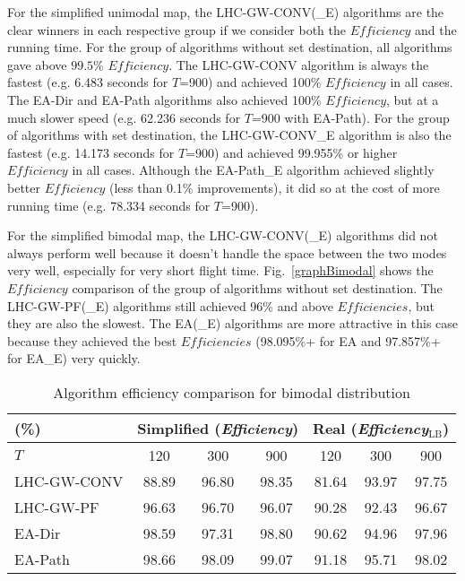 For the simplified unimodal map, the LHC-GW-CONV(\_E) algorithms are the clear winners in each respective group if we consider both the $\mathit{Efficiency}$ and the running time. For the group of algorithms without set destination, all algorithms gave above $99.5\%$ $\mathit{Efficiency}$. The LHC-GW-CONV algorithm is always the fastest  (e.g. 6.483 seconds for $T$=900) and achieved 100\% $\mathit{Efficiency}$ in all cases. The EA-Dir and EA-Path algorithms also achieved 100\% $\mathit{Efficiency}$, but at a much slower speed (e.g. 62.236 seconds for $T$=900 with EA-Path). For the group of algorithms with set destination, the LHC-GW-CONV\_E algorithm is also the fastest  (e.g. 14.173 seconds for $T$=900) and achieved 99.955\% or higher $\mathit{Efficiency}$ in all cases. Although the EA-Path\_E algorithm achieved slightly better $\mathit{Efficiency}$ (less than 0.1\% improvements), it did so at the cost of more running time (e.g. 78.334 seconds for $T$=900).

For the simplified bimodal map, the LHC-GW-CONV(\_E) algorithms did not always perform well because it doesn't handle the space between the two modes very well, especially for very short flight time. Fig.~\ref{graphBimodal} shows the $\mathit{Efficiency}$ comparison of the group of algorithms without set destination. The LHC-GW-PF(\_E) algorithms still achieved 96\% and above $\mathit{Efficiencies}$, but they are also the slowest. The EA(\_E) algorithms are more attractive in this case because they achieved the best $\mathit{Efficiencies}$ (98.095\%+ for EA and 97.857\%+ for EA\_E) very quickly.

\begin{table}
	\centering
		\begin{tabular}
			{|l|c|c|c|c|c|c|}
			\hline
			(\%) & \multicolumn{3}{|c|}{Simplified ({\it{Efficiency}})} & \multicolumn{3}{|c|}{Real ({\it{Efficiency$_\textrm{LB}$}})} \\
			\hline
			$T$ & 120 & 300 & 900	& 120 & 300 & 900 \\
			\hline
			LHC-GW-CONV & 88.89 & 96.80 & 98.35 & 81.64 & 93.97 & 97.75 \\
			\hline			
			LHC-GW-PF	& 96.63 & 96.70 & 96.07 & 90.28 & 92.43 & 96.67 \\ 
			\hline
			EA-Dir & 98.59 & 97.31 & 98.80 & 90.62 & 94.96 & 97.96 \\
			\hline
			EA-Path & 98.66 & 98.09 & 99.07 & 91.18 & 95.71 & 98.02 \\
			\hline
		\end{tabular}
\caption{Algorithm efficiency comparison for bimodal distribution}
\label{EBimodalSimplified}
\vspace*{-5ex}
\end{table}

